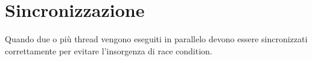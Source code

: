 \chapter{Sincronizzazione}

Quando due o più thread vengono eseguiti in parallelo devono essere sincronizzati correttamente per evitare l'insorgenza di race condition.






